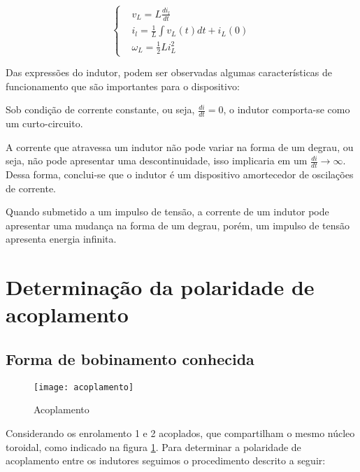 \documentclass[12pt,fleqn]{book} %
\begin{document}
{\begin{equation}
\left\{\begin{aligned} & 
        v_L=L\frac{di_l}{dt}\\& 
        i_l=\frac{1}{L}\int v_L(t)dt + i_L(0)\\& 
        \omega_L=\frac{1}{2}Li_L^2
    \end{aligned}\right.
\end{equation}

Das expressões do indutor, podem ser observadas algumas características de funcionamento que são importantes para o dispositivo:

\begin{remark}
Sob condição de corrente constante, ou seja, $\frac{di}{dt}=0$, o indutor comporta-se como um curto-circuito.
\end{remark}

\begin{remark}
	A corrente que atravessa um indutor não pode variar na forma de um degrau, ou seja, não pode apresentar uma descontinuidade, isso implicaria em um $\frac{di}{dt}\rightarrow\infty$. Dessa forma, conclui-se que o indutor é um dispositivo amortecedor de oscilações de corrente.
\end{remark}

\begin{remark}
Quando submetido a um impulso de tensão, a corrente de um indutor pode apresentar uma mudança na forma de um degrau, porém, um impulso de tensão apresenta energia infinita.
\end{remark}

\section{Determinação da polaridade de acoplamento}

    \subsection{Forma de bobinamento conhecida}
    
        \begin{figure}[!htbp] \centering\texttt{[image: acoplamento]}
            \caption{Acoplamento}\label{acoplamento} 
        \end{figure}    
    
    Considerando os enrolamento 1 e 2 acoplados, que compartilham o mesmo núcleo toroidal, como indicado na figura \ref{acoplamento}. Para determinar a polaridade de acoplamento entre os indutores seguimos o procedimento descrito a seguir:
    
}
\end{document}
